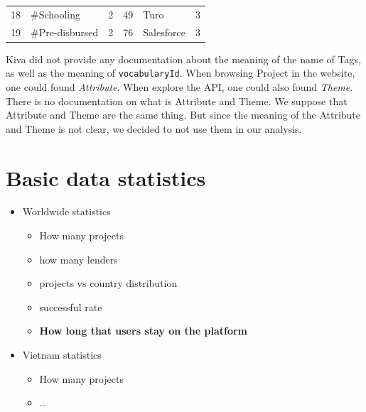 \begin{longtable}{|r|l|l|r|l|l|}
    18                                & \#Schooling                        & 2                                                       & 49                               & Turo                                & 3                                                      \\
    19                                & \#Pre-disbursed                    & 2                                                       & 76                               & Salesforce                          & 3                                                      \\
\end{longtable}


Kiva did not provide any documentation about the meaning of the name of Tags,
as well as the meaning of \lstinline|vocabularyId|.
When browsing Project in the website, one could found \textit{Attribute}.
When explore the API, one could also found \textit{Theme}.
There is no documentation on what is Attribute and Theme.
We suppose that Attribute and Theme are the same thing.
But since the meaning of the Attribute and Theme is not clear,
we decided to not use them in our analysis.

\section{Basic data statistics}

\begin{itemize}
    \item Worldwide statistics
          \begin{itemize}
              \item How many projects
              \item how many lenders
              \item projects vs country distribution
              \item successful rate
              \item \textbf{How long that users stay on the platform}
          \end{itemize}
    \item Vietnam statistics
          \begin{itemize}
              \item How many projects
              \item \dots
          \end{itemize}
\end{itemize}